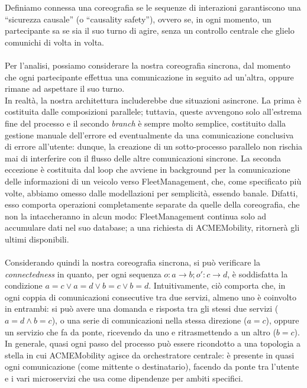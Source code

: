 Definiamo connessa una coreografia se le sequenze di interazioni garantiscono
una ``sicurezza causale'' (o ``causality safety''), ovvero se, in ogni momento,
un partecipante sa se sia il suo turno di agire, senza un controllo centrale che
glielo comunichi di volta in volta.\\
\\
Per l'analisi, possiamo considerare la nostra coreografia sincrona, dal momento
che ogni partecipante effettua una comunicazione in seguito ad un'altra, oppure
rimane ad aspettare il suo turno.\\
In realtà, la nostra architettura includerebbe due situazioni asincrone. La
prima è costituita dalle composizioni parallele; tuttavia, queste avvengono solo
all'estrema fine del processo e il secondo \textit{branch} è sempre molto
semplice, costituito dalla gestione manuale dell'errore ed eventualmente da una
comunicazione conclusiva di errore all'utente: dunque, la creazione di un
sotto-processo parallelo non rischia mai di interferire con il flusso delle
altre comunicazioni sincrone. La seconda eccezione è costituita dal loop che
avviene in background per la comunicazione delle informazioni di un veicolo
verso FleetManagement, che, come specificato più volte, abbiamo omesso dalle
modellazioni per semplicità, essendo banale. Difatti, esso comporta operazioni
completamente separate da quelle della coreografia, che non la intaccheranno in
alcun modo: FleetManagement continua solo ad accumulare dati nel suo database; a
una richiesta di ACMEMobility, ritornerà gli ultimi disponibili.\\
\\
Considerando quindi la nostra coreografia sincrona, si può verificare la
\textit{connectedness} in quanto, per ogni sequenza \mbox{$o: a \rightarrow b ;
o': c \rightarrow d$}, è soddisfatta la condizione \mbox{$a=c \lor a=d \lor b=c
\lor b=d$}. Intuitivamente, ciò comporta che, in ogni coppia di comunicazioni
consecutive tra due servizi, almeno uno è coinvolto in entrambi: si può avere
una domanda e risposta tra gli stessi due servizi (\mbox{$a=d \land b=c$}), o
una serie di comunicazioni nella stessa direzione (\mbox{$a=c$}), oppure un
servizio che fa da ponte, ricevendo da uno e ritrasmettendo a un altro
(\mbox{$b=c$}).\\
In generale, quasi ogni passo del processo può essere ricondotto a una topologia
a stella in cui \mbox{ACMEMobility} agisce da orchestratore centrale: è presente in
quasi ogni comunicazione (come mittente o destinatario), facendo da ponte tra
l'utente e i vari microservizi che usa come dipendenze per ambiti specifici.
